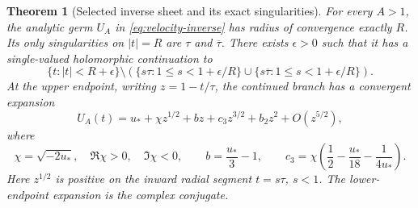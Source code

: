 \documentclass[11pt]{article}
\numberwithin{equation}{section}
\newtheorem{theorem}{Theorem}[section]
\theoremstyle{definition}
\theoremstyle{remark}
\begin{document}
\begin{theorem}[Selected inverse sheet and its exact singularities]
\label{thm:selected-sheet}
For every $A>1$, the analytic germ $U_A$ in
\eqref{eq:velocity-inverse} has radius of convergence exactly $R$.
Its only singularities on $|t|=R$ are $\tau$ and $\overline\tau$.
There exists $\epsilon>0$ such that it has a single-valued holomorphic
continuation to
\begin{equation}\label{eq:slit-domain}
 \{t:|t|<R+\epsilon\}\setminus
 \left(\{s\tau:1\leq s<1+\epsilon/R\}
       \cup\{s\overline\tau:1\leq s<1+\epsilon/R\}\right).
\end{equation}
At the upper endpoint, writing $z=1-t/\tau$, the continued branch has a
convergent expansion
\begin{equation}\label{eq:selected-puiseux}
 U_A(t)=u_*+\chi z^{1/2}+b z+c_3z^{3/2}+b_2z^2+O(z^{5/2}),
\end{equation}
where
\begin{equation}\label{eq:puiseux-first-coefficients}
 \chi=\sqrt{-2u_*},\quad\Re\chi>0,\quad\Im\chi<0,
 \qquad b=\frac{u_*}{3}-1,
 \qquad c_3=\chi\left(\frac12-\frac{u_*}{18}-\frac1{4u_*}\right).
\end{equation}
Here $z^{1/2}$ is positive on the inward radial segment $t=s\tau$,
$s<1$.  The lower-endpoint expansion is the complex conjugate.
\end{theorem}
\end{document}
